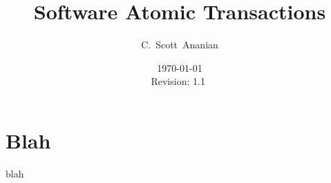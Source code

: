 \documentclass[11pt,notitlepage,twocolumn]{article}
\author{C.~Scott~Ananian}
\title{Software Atomic Transactions}
\date{\today \\ $ $Revision: 1.1 $ $}
\begin{document}
%
\maketitle
\section{Blah}
blah
%
\end{document}
